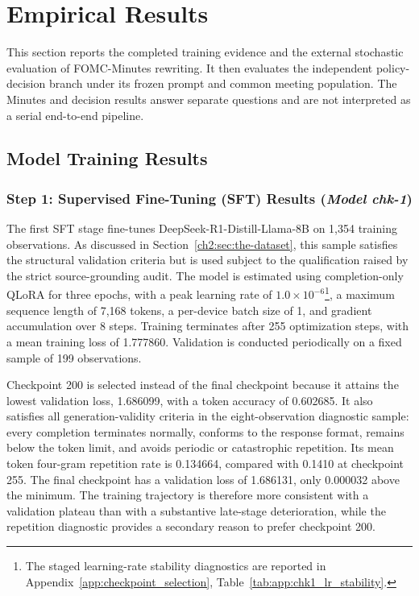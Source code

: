 \section{Empirical Results}\label{ch2:sec:result}

This section reports the completed training evidence and the external
stochastic evaluation of FOMC-Minutes rewriting. It then evaluates the
independent policy-decision branch under its frozen prompt and common meeting
population. The Minutes and decision results answer separate questions and are
not interpreted as a serial end-to-end pipeline.


\subsection*{Model Training Results}

\subsubsection*{Step 1: Supervised Fine-Tuning (SFT) Results (\textit{Model chk-1})}

The first SFT stage fine-tunes DeepSeek-R1-Distill-Llama-8B on 1,354 training
observations.  As discussed in Section~\ref{ch2:sec:the-dataset}, this sample
satisfies the structural validation criteria but is used subject to the
qualification raised by the strict source-grounding audit.  The model is
estimated using completion-only QLoRA for three epochs, with a peak learning
rate of \(1.0\times10^{-6}\)\footnote{The staged learning-rate stability
diagnostics are reported in Appendix~\ref{app:checkpoint_selection},
Table~\ref{tab:app:chk1_lr_stability}.}, a maximum sequence length of 7,168 tokens, a
per-device batch size of 1, and gradient accumulation over 8 steps.  Training
terminates after 255 optimization steps, with a mean training loss of
1.777860.  Validation is conducted periodically on a fixed sample of 199
observations.

Checkpoint 200 is selected instead of the final checkpoint because it attains
the lowest validation loss, 1.686099, with a token accuracy of 0.602685.  It
also satisfies all generation-validity criteria in the eight-observation
diagnostic sample: every completion terminates normally, conforms to the
response format, remains below the token limit, and avoids periodic or
catastrophic repetition.  Its mean token four-gram repetition rate is
0.134664, compared with 0.1410 at checkpoint 255.  The final checkpoint has a
validation loss of 1.686131, only 0.000032 above the minimum.  The training
trajectory is therefore more consistent with a validation plateau than with a
substantive late-stage deterioration, while the repetition diagnostic provides
a secondary reason to prefer checkpoint 200.

